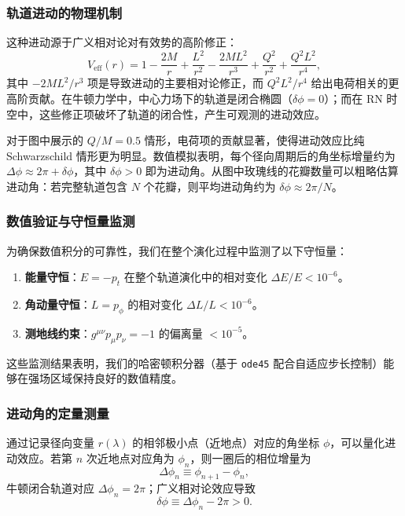 \documentclass[a4paper,12pt]{article}
\begin{document}
\subsubsection{轨道进动的物理机制}

这种进动源于广义相对论对有效势的高阶修正：
\begin{equation}
V_{\text{eff}}(r) = 1 - \frac{2M}{r} + \frac{L^2}{r^2} - \frac{2ML^2}{r^3} + \frac{Q^2}{r^2} + \frac{Q^2 L^2}{r^4},
\end{equation}
其中 $-2ML^2/r^3$ 项是导致进动的主要相对论修正，而 $Q^2L^2/r^4$ 给出电荷相关的更高阶贡献。在牛顿力学中，中心力场下的轨道是闭合椭圆（$\delta\phi = 0$）；而在 RN 时空中，这些修正项破坏了轨道的闭合性，产生可观测的进动效应。

对于图中展示的 $Q/M = 0.5$ 情形，电荷项的贡献显著，使得进动效应比纯 Schwarzschild 情形更为明显。数值模拟表明，每个径向周期后的角坐标增量约为 $\Delta\phi \approx 2\pi + \delta\phi$，其中 $\delta\phi > 0$ 即为进动角。从图中玫瑰线的花瓣数量可以粗略估算进动角：若完整轨道包含 $N$ 个花瓣，则平均进动角约为 $\delta\phi \approx 2\pi/N$。

\subsubsection{数值验证与守恒量监测}

为确保数值积分的可靠性，我们在整个演化过程中监测了以下守恒量：

\begin{enumerate}
\item \textbf{能量守恒}：$E = -p_t$ 在整个轨道演化中的相对变化 $\Delta E / E < 10^{-6}$。
\item \textbf{角动量守恒}：$L = p_\phi$ 的相对变化 $\Delta L / L < 10^{-6}$。
\item \textbf{测地线约束}：$g^{\mu\nu} p_\mu p_\nu = -1$ 的偏离量 $< 10^{-5}$。
\end{enumerate}

这些监测结果表明，我们的哈密顿积分器（基于 \texttt{ode45} 配合自适应步长控制）能够在强场区域保持良好的数值精度。

\subsubsection{进动角的定量测量}

通过记录径向变量 $r(\lambda)$ 的相邻极小点（近地点）对应的角坐标 $\phi$，可以量化进动效应。若第 $n$ 次近地点对应角为 $\phi_n$，则一圈后的相位增量为
\begin{equation}
\Delta \phi_n \equiv \phi_{n+1} - \phi_n,
\end{equation}
牛顿闭合轨道对应 $\Delta \phi_n = 2\pi$；广义相对论效应导致
\begin{equation}
\delta \phi \equiv \Delta \phi_n - 2\pi > 0.
\end{equation}
\end{document}

